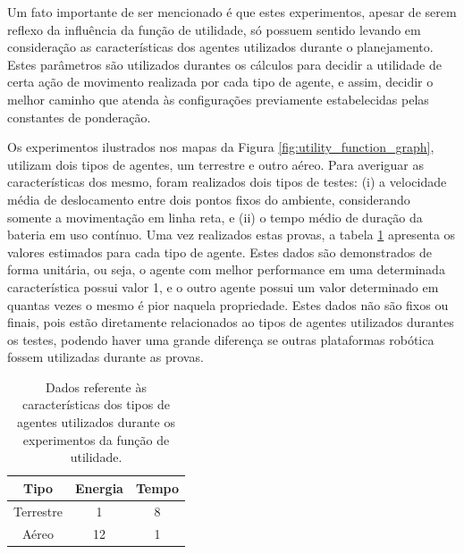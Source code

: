 Um fato importante de ser mencionado é que estes experimentos, apesar de serem reflexo da influência da função de utilidade, só possuem sentido levando em consideração as características dos agentes utilizados durante o planejamento.
Estes parâmetros são utilizados durantes os cálculos para decidir a utilidade de certa ação de movimento realizada por cada tipo de agente, e assim, decidir o melhor caminho que atenda às configurações previamente estabelecidas pelas constantes de ponderação.

Os experimentos ilustrados nos mapas da Figura \ref{fig:utility_function_graph}, utilizam dois tipos de agentes, um terrestre e outro aéreo. Para averiguar as características dos mesmo, foram realizados dois tipos de testes: (i) a velocidade média de deslocamento entre dois pontos fixos do ambiente, considerando somente a movimentação em linha reta, e (ii) o tempo médio de duração da bateria em uso contínuo.
Uma vez realizados estas provas, a tabela \ref{table:caracteristicas} apresenta os valores estimados para cada tipo de agente.
Estes dados são demonstrados de forma unitária, ou seja, o agente com melhor performance em uma determinada característica possui valor 1, e o outro agente possui um valor determinado em quantas vezes o mesmo é pior naquela propriedade.
Estes dados não são fixos ou finais, pois estão diretamente relacionados ao tipos de agentes utilizados durantes os testes, podendo haver uma grande diferença se outras plataformas robótica fossem utilizadas durante as provas.

\begin{table}
    \centering
    \caption[Dados referente às características dos tipos de agentes]{Dados referente às características dos tipos de agentes utilizados durante os experimentos da função de utilidade.}
    \label{table:caracteristicas}
    \begin{tabular}{|c|c|c|}
    \hline
    Tipo      & Energia & Tempo \\ \hline
    Terrestre & 1       & 8     \\ \hline
    Aéreo     & 12      & 1     \\ \hline
    \end{tabular}
\end{table}

